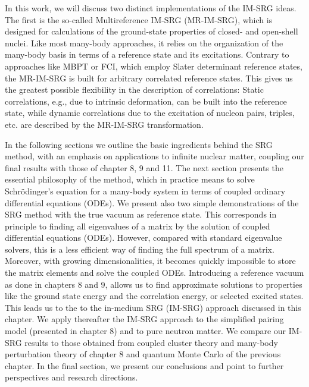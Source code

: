 In this work, we will discuss two distinct implementations of the 
IM-SRG ideas. The first is the so-called Multireference IM-SRG (MR-IM-SRG),
which is designed for calculations of the ground-state properties of 
closed- and open-shell nuclei.  Like most many-body
approaches, it relies on the organization of the many-body basis
in terms of a reference state and its excitations. 
Contrary to approaches like MBPT or FCI, which employ Slater
determinant reference states, the MR-IM-SRG is built for arbitrary
correlated reference states. This gives us the greatest possible
flexibility in the description of correlations: Static correlations,
e.g., due to intrinsic deformation, can be built into the reference
state, while dynamic correlations due to the excitation of nucleon pairs, 
triples, etc. are described by the MR-IM-SRG transformation. 

In the following sections we outline the basic ingredients behind the
SRG method, with an emphasis on applications to infinite nuclear
matter, coupling our final results with those of chapter 8, 9 and
11. The next section presents the essential philosophy of the method,
which in practice means to solve Schr\"odinger's equation for a
many-body system in terms of coupled ordinary differential equations
(ODEs). We present also two simple demonstrations of the SRG method with the true vacuum as reference state. This corresponds in principle to finding all eigenvalues of a matrix by the solution of coupled differential equations (ODEs). 
However, compared with standard eigenvalue solvers, this is a less efficient way of finding the full spectrum of a matrix. 
Moreover, with growing dimensionalities, it becomes quickly impossible to store the matrix elements and solve the coupled ODEs. 
Introducing a reference vacuum as done in chapters 8 and 9, allows us to find approximate solutions to properties  like the  ground state energy and the correlation energy, or selected excited states. This leads us to the
to the in-medium SRG (IM-SRG) approach discussed in this chapter. 
We apply thereafter the IM-SRG approach to the simplified pairing  model (presented in chapter 8) and 
to pure neutron matter. We compare our IM-SRG results to those obtained from coupled cluster theory and many-body perturbation theory of  chapter 8 and quantum Monte Carlo of the previous chapter.  In the final section, we present our conclusions and point  to further
perspectives and research directions.

